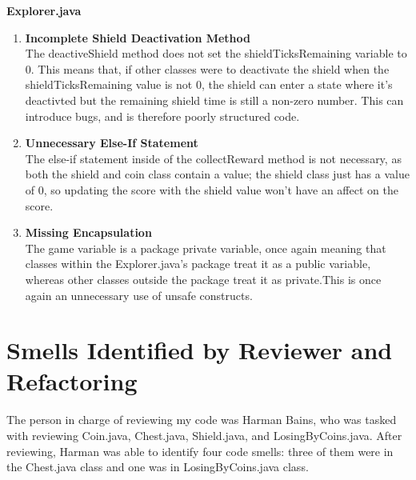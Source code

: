 \documentclass[12pt, letterpaper]{article}
\begin{document}
\textbf{Explorer.java}
\begin{enumerate}
    \item \textbf{Incomplete Shield Deactivation Method} \\
    The deactiveShield method does not set the shieldTicksRemaining variable to 0. This means that, if other classes were to deactivate the shield when the shieldTicksRemaining value is not 0, the shield can enter a state where it's deactivted but the remaining shield time is still a non-zero number. This can introduce bugs, and is therefore poorly structured code.

    \item \textbf{Unnecessary Else-If Statement} \\
    The else-if statement inside of the collectReward method is not necessary, as both the shield and coin class contain a value; the shield class just has a value of 0, so updating the score with the shield value won't have an affect on the score.

    \item \textbf{Missing Encapsulation} \\
     The game variable is a package private variable, once again meaning that classes within the Explorer.java's package treat it as a public variable, whereas other classes outside the package treat it as private.This is once again an unnecessary use of unsafe constructs.
\end{enumerate}

\section{Smells Identified by Reviewer and Refactoring}
The person in charge of reviewing my code was Harman Bains, who was tasked with reviewing Coin.java, Chest.java, Shield.java, and LosingByCoins.java. After reviewing, Harman was able to identify four code smells: three of them were in the Chest.java class and one was in LosingByCoins.java class. \\
\end{document}
